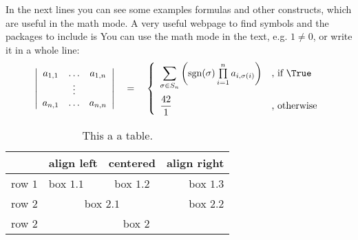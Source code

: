 In the next lines you can see some examples formulas and other
constructs, which are useful in the math mode. A very useful webpage
to find symbols and the packages to include is
You can use the math mode in the text, e.g. $1\neq0$, or write it in
a whole line:
\[\left|\begin{array}{ccc}
		a_{1,1} & \ldots & a_{1,n}  \\
				& \vdots & 			\\
		a_{n,1} & \ldots & a_{n,n}
	\end{array}
\right|
\quad = \quad 
\left\{
	\begin{array}{ll}
			{\displaystyle \sum\limits_{\sigma\in S_n}} 
			\left(
				\text{sgn}(\sigma)
				\prod\limits_{i=1}^{n}a_{i,\sigma(i)}
			\right) 
			& 
			\text{, if }\True 
		\\[0.6cm] %
			{\displaystyle\frac{42}{1}} & \text{, otherwise}
	\end{array}
\right.\]


\begin{table}[htb]
	\caption{This a a table.}
	\label{tab:nameOfTheTable}
	\bigskip %
	\begin{center}
		\begin{tabular}{|l||l|c|r|}
			\hline
			& align left 	& centered & align right \\
			\hline \hline
			row $1$ & box $1.1$ & box $1.2$ & box $1.3$ \\
			\hline
			row $2$ & \multicolumn{2}{c|}{box $2.1$} & box $2.2$ \\
			\hline
			row $2$ & \multicolumn{3}{c|}{box $2$} \\
			\hline
		\end{tabular}
	\end{center}
\end{table}

